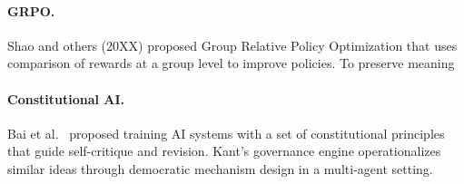 \paragraph{GRPO.}
Shao and others (20XX) proposed Group Relative Policy Optimization that uses comparison of rewards at a group level to improve policies. To preserve meaning

\paragraph{Constitutional AI.}
Bai et al.~\citep{bai2022constitutional} proposed training AI systems
with a set of constitutional principles that guide self-critique and
revision. Kant's governance engine operationalizes similar ideas through
democratic mechanism design in a multi-agent setting.
